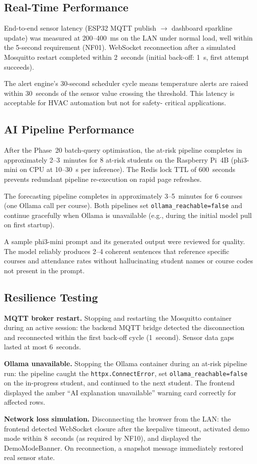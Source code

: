 \subsection{Real-Time Performance}
\label{subsec:realtime_perf}

End-to-end sensor latency (ESP32 MQTT publish $\rightarrow$ dashboard
sparkline update) was measured at 200--400~ms on the LAN under normal
load, well within the 5-second requirement (NF01).  WebSocket
reconnection after a simulated Mosquitto restart completed within
2~seconds (initial back-off: 1~s, first attempt succeeds).

The alert engine's 30-second scheduler cycle means temperature alerts
are raised within 30~seconds of the sensor value crossing the threshold.
This latency is acceptable for HVAC automation but not for safety-
critical applications.

\subsection{AI Pipeline Performance}
\label{subsec:ai_perf}

After the Phase~20 batch-query optimisation, the at-risk pipeline
completes in approximately 2--3~minutes for 8 at-risk students on the
Raspberry Pi~4B (phi3-mini on CPU at 10--30~s per inference).  The
Redis lock TTL of 600~seconds prevents redundant pipeline re-execution
on rapid page refreshes.

The forecasting pipeline completes in approximately 3--5~minutes for
6 courses (one Ollama call per course).  Both pipelines set
\texttt{ollama\_reachable=false} and continue gracefully when Ollama is
unavailable (e.g., during the initial model pull on first startup).

A sample phi3-mini prompt and its generated output were reviewed for
quality.  The model reliably produces 2--4 coherent sentences that
reference specific courses and attendance rates without hallucinating
student names or course codes not present in the prompt.

\subsection{Resilience Testing}
\label{subsec:resilience}

\textbf{MQTT broker restart.}  Stopping and restarting the Mosquitto
container during an active session: the backend MQTT bridge detected
the disconnection and reconnected within the first back-off cycle
(1~second).  Sensor data gaps lasted at most 6~seconds.

\textbf{Ollama unavailable.}  Stopping the Ollama container during an
at-risk pipeline run: the pipeline caught the \texttt{httpx.ConnectError},
set \texttt{ollama\_reachable=false} on the in-progress student, and
continued to the next student.  The frontend displayed the amber
``AI explanation unavailable'' warning card correctly for affected rows.

\textbf{Network loss simulation.}  Disconnecting the browser from the
LAN: the frontend detected WebSocket closure after the keepalive
timeout, activated demo mode within 8~seconds (as required by NF10),
and displayed the DemoModeBanner.  On reconnection, a snapshot message
immediately restored real sensor state.
